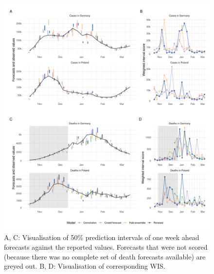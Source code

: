 \documentclass[
]{article}
\begin{document}
\begin{figure}[H]
\includegraphics[width=1\linewidth,]{../analysis/plots/figure-forecasts-1} \caption{A, C: Visualisation of 50\% prediction intervals of one week ahead forecasts against the reported values. Forecasts that were not scored (because there was no complete set of death forecasts available) are greyed out. B, D: Visualisation of corresponding WIS.}\label{fig:forecasts-and-truth-1}
\end{figure}
\end{document}
